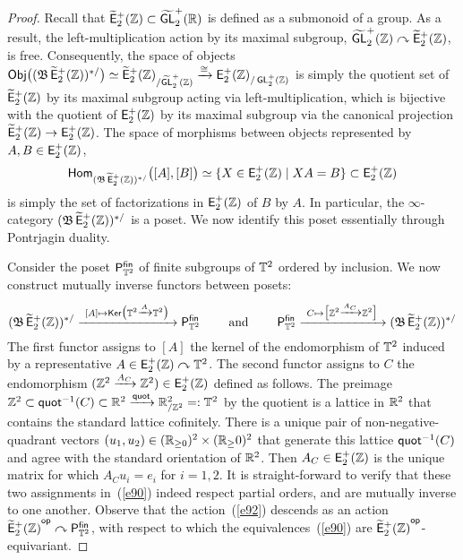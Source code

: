 \begin{proof}
Recall that $\Ebraid \subset \w{\GL}^+_2(\RR)$ is defined as a submonoid of a group.
As a result, the left-multiplication action by its maximal subgroup,
$\w{\GL}_2^+(\ZZ) \lacts \Ebraid$, is free.  
Consequently, the space of objects $\Obj\bigl( (\fB \Ebraid)^{\ast/} \bigr) \simeq \Ebraid_{/\w{\GL}^+_2(\ZZ)}\xra{\cong} \EpZ_{/\GL_2^+(\ZZ)}$ is simply the quotient set of $\Ebraid$ by its maximal subgroup acting via left-multiplication, which is bijective with the quotient of $\EpZ$ by its maximal subgroup via the canonical projection $\Ebraid \to \EpZ$.  
The space of morphisms between objects represented by $A, B\in \EpZ$,
\[
\Hom_{(\fB \Ebraid)^{\ast/}}\bigl( [A] , [B] \bigr)\simeq  \{X \in \EpZ \mid XA=B\}\subset \EpZ
\]
is simply the set of factorizations in $\EpZ$ of $B$ by $A$.
In particular, the $\infty$-category $(\fB \Ebraid)^{\ast/}$ is a poset.  
We now identify this poset essentially through Pontrjagin duality.  



Consider the poset $\sP^{\sf fin}_{\TT^2}$ of finite subgroups of $\TT^2$ ordered by inclusion.  
We now construct mutually inverse functors between posets:
\begin{equation}
\label{e90}
(\fB \Ebraid)^{\ast/}
\xra{~[A]
\mapsto 
\Ker\bigl( \TT^2 \xra{A} \TT^2 \bigr)
~}
\sP^{\sf fin}_{\TT^2}
\qquad
\text{ and }
\qquad
\sP^{\sf fin}_{\TT^2}
\xra{~C
\mapsto 
\bigl[ \ZZ^2 \xra{A_C} \ZZ^2 \bigr]
~}
(\fB \Ebraid)^{\ast/}
\end{equation}
The first functor assigns to $[A]$ the kernel of the endomorphism of $\TT^2$ induced by a representative $A \in \EpZ \lacts \TT^2$.   
The second functor assigns to $C$ the endomorphism $(\ZZ^2 \xra{A_C}\ZZ^2)\in \EpZ$ defined as follows.
The preimage $\ZZ^2 \subset \quot^{-1}(C) \subset \RR^2 \xra{\quot} \RR^2_{/\ZZ^2} =:\TT^2$ by the quotient is a lattice in $\RR^2$ that contains the standard lattice cofinitely.
There is a unique pair of non-negative-quadrant vectors $(u_1,u_2)\in (\RR_{\geq 0})^2\times (\RR_\geq 0)^2$ that generate this lattice $\quot^{-1}(C)$ and agree with the standard orientation of $\RR^2$.
Then $A_C \in \EpZ$ is the unique matrix for which $A_C u_i = e_i$ for $i=1,2$.  
It is straight-forward to verify that these two assignments in~(\ref{e90}) indeed respect partial orders, and are mutually inverse to one another.
Observe that the action~(\ref{e92}) descends as an action $\Ebraid^{\op}\lacts \sP^{\sf fin}_{\TT^2}$, with respect to which the equivalences~(\ref{e90}) are $\Ebraid^{\op}$-equivariant.






\end{proof}
